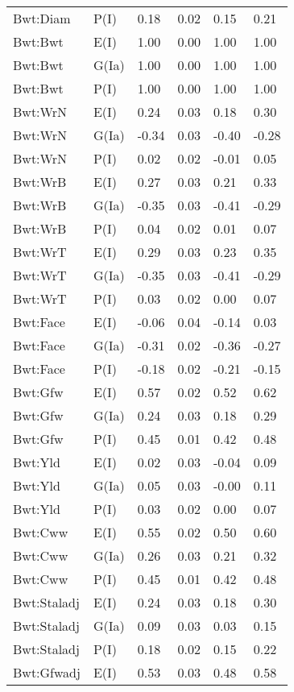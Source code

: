 \begin{center}
\begin{longtable}{|p{1.1in}|p{0.7in}|p{0.7in}|p{0.6in}|p{0.6in}|p{0.6in}|}
  Bwt:Diam & P(I) & 0.18 & 0.02 & 0.15 & 0.21 \\ 
  Bwt:Bwt & E(I) & 1.00 & 0.00 & 1.00 & 1.00 \\ 
  Bwt:Bwt & G(Ia) & 1.00 & 0.00 & 1.00 & 1.00 \\ 
  Bwt:Bwt & P(I) & 1.00 & 0.00 & 1.00 & 1.00 \\ 
  Bwt:WrN & E(I) & 0.24 & 0.03 & 0.18 & 0.30 \\ 
  Bwt:WrN & G(Ia) & -0.34 & 0.03 & -0.40 & -0.28 \\ 
  Bwt:WrN & P(I) & 0.02 & 0.02 & -0.01 & 0.05 \\ 
  Bwt:WrB & E(I) & 0.27 & 0.03 & 0.21 & 0.33 \\ 
  Bwt:WrB & G(Ia) & -0.35 & 0.03 & -0.41 & -0.29 \\ 
  Bwt:WrB & P(I) & 0.04 & 0.02 & 0.01 & 0.07 \\ 
  Bwt:WrT & E(I) & 0.29 & 0.03 & 0.23 & 0.35 \\ 
  Bwt:WrT & G(Ia) & -0.35 & 0.03 & -0.41 & -0.29 \\ 
  Bwt:WrT & P(I) & 0.03 & 0.02 & 0.00 & 0.07 \\ 
  Bwt:Face & E(I) & -0.06 & 0.04 & -0.14 & 0.03 \\ 
  Bwt:Face & G(Ia) & -0.31 & 0.02 & -0.36 & -0.27 \\ 
  Bwt:Face & P(I) & -0.18 & 0.02 & -0.21 & -0.15 \\ 
  Bwt:Gfw & E(I) & 0.57 & 0.02 & 0.52 & 0.62 \\ 
  Bwt:Gfw & G(Ia) & 0.24 & 0.03 & 0.18 & 0.29 \\ 
  Bwt:Gfw & P(I) & 0.45 & 0.01 & 0.42 & 0.48 \\ 
  Bwt:Yld & E(I) & 0.02 & 0.03 & -0.04 & 0.09 \\ 
  Bwt:Yld & G(Ia) & 0.05 & 0.03 & -0.00 & 0.11 \\ 
  Bwt:Yld & P(I) & 0.03 & 0.02 & 0.00 & 0.07 \\ 
  Bwt:Cww & E(I) & 0.55 & 0.02 & 0.50 & 0.60 \\ 
  Bwt:Cww & G(Ia) & 0.26 & 0.03 & 0.21 & 0.32 \\ 
  Bwt:Cww & P(I) & 0.45 & 0.01 & 0.42 & 0.48 \\ 
  Bwt:Staladj & E(I) & 0.24 & 0.03 & 0.18 & 0.30 \\ 
  Bwt:Staladj & G(Ia) & 0.09 & 0.03 & 0.03 & 0.15 \\ 
  Bwt:Staladj & P(I) & 0.18 & 0.02 & 0.15 & 0.22 \\ 
  Bwt:Gfwadj & E(I) & 0.53 & 0.03 & 0.48 & 0.58 \\ 

\end{longtable}
\end{center}
